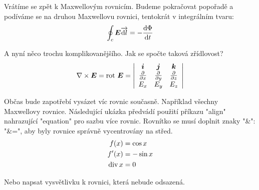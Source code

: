 \documentclass[12pt,a4paper,oneside]{article}
\numberwithin{equation}{section} %
\numberwithin{figure}{section} %
\numberwithin{table}{section} %
\renewcommand{\vec}[1]{\mbox{\boldmath$#1$}} %
\newcommand{\rot}{\mathrm{rot}\ }
\renewcommand{\div}{\mathrm{div}\ }
\begin{document}
Vrátíme se zpět k Maxwellovým rovnicím. Budeme pokračovat popořadě a podíváme se na druhou Maxwellovu rovnici, tentokrát v integrálním tvaru:
\begin{equation}
\oint_c \vec{E} \overrightarrow{\ud l} = -\frac{\ud\Phi}{\ud t}
\end{equation}

A nyní něco trochu komplikovanějšího. Jak se spočte taková zřídlovost?
\begin{equation}
\nabla \times \vec{E} = \rot \vec{E} = \left| 
\begin{array}{c c c}
\vec{i} & \vec{j} & \vec{k} \\
\frac{\partial}{\partial x} & \frac{\partial}{\partial y} & \frac{\partial}{\partial z} \\
E_x & E_y & E_z
\end{array} \right|
\end{equation}

Občas bude zapotřebí vysázet víc rovnic současně. Například všechny Maxwellovy rovnice. Následující ukázka předvádí použití příkazu "align" nahrazující "equation" pro sazbu více rovnic. Rovnítko se musí doplnit znaky "\&": "\&=", aby byly rovnice správně vycentrovány na střed.
\begin{subequations}
\begin{align}
f(x)&=\cos x
\\
f'(x)&=-\sin x
\\
\mathop{\rm div}\nolimits x &= 0
\end{align}
\end{subequations}

\noindent
Nebo napsat vysvětlivku k rovnici, která nebude odsazená.
\end{document}
